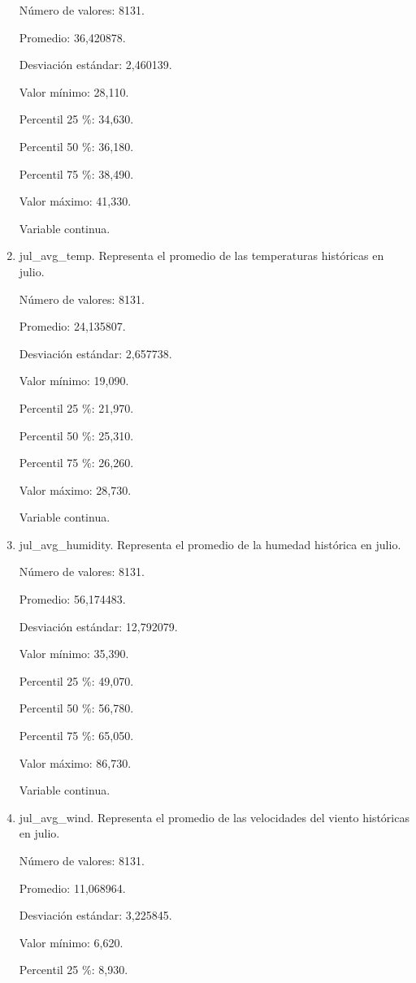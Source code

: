 \begin{enumerate}
	Número de valores: 8131.
	
	Promedio: 36,420878.
	
	Desviación estándar: 2,460139.
	
	Valor mínimo: 28,110.
	
	Percentil 25 \%: 34,630.
	
	Percentil 50 \%: 36,180.
	
	Percentil 75 \%: 38,490.
	
	Valor máximo: 41,330.
	
	Variable continua.

	\item jul\_avg\_temp. Representa el promedio de las temperaturas históricas en julio.
	
	Número de valores: 8131.
	
	Promedio: 24,135807.
	
	Desviación estándar: 2,657738.
	
	Valor mínimo: 19,090.
	
	Percentil 25 \%: 21,970.
	
	Percentil 50 \%: 25,310.
	
	Percentil 75 \%: 26,260.
	
	Valor máximo: 28,730.
	
	Variable continua.

	\item jul\_avg\_humidity. Representa el promedio de la humedad histórica en julio.
	
	Número de valores: 8131.
	
	Promedio: 56,174483.
	
	Desviación estándar: 12,792079.
	
	Valor mínimo: 35,390.
	
	Percentil 25 \%: 49,070.
	
	Percentil 50 \%: 56,780.
	
	Percentil 75 \%: 65,050.
	
	Valor máximo: 86,730.
	
	Variable continua.

	\item jul\_avg\_wind. Representa el promedio de las velocidades del viento históricas en julio.
	
	Número de valores: 8131.
	
	Promedio: 11,068964.
	
	Desviación estándar: 3,225845.
	
	Valor mínimo: 6,620.
	
	Percentil 25 \%: 8,930.
	

\end{enumerate}
